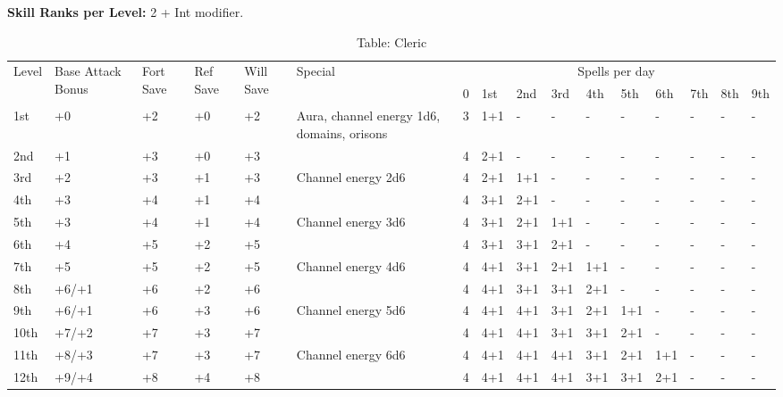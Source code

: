 \textbf{Skill Ranks per Level: }2 + Int modifier.

\begin{table}[]
\caption{Table: Cleric}
\sffamily
\setlength{\tabcolsep}{1pt}
\begin{tabularx}{\linewidth}{lp{6em}p{2.5em}p{2.5em}p{2.5em}Xllllllllll}
\multirow{2}{*}{Level} & \multirow{2}{*}{\parbox{5em}{Base Attack Bonus}} & \multirow{2}{*}{\parbox{1.5em}{Fort Save}} & \multirow{2}{*}{\parbox{1.5em}{Ref Save}} & \multirow{2}{*}{\parbox{1.5em}{Will Save}} & Special                                                                                              & \multicolumn{10}{c}{Spells per day} \\
                       &                                    &                            &                           &                            &                                                                                                  &  0 & 1st & 2nd & 3rd & 4th & 5th & 6th & 7th & 8th & 9th \\
\hline
1st & +0 & +2 & +0 & +2 & Aura, channel energy 1d6, domains, orisons & 3 & 1+1 & - & - & - & - & - & - & - & -\\
2nd & +1 & +3 & +0 & +3 &  & 4 & 2+1 & - & - & - & - & - & - & - & -\\
3rd & +2 & +3 & +1 & +3 & Channel energy 2d6 & 4 & 2+1 & 1+1 & - & - & - & - & - & - & -\\
4th & +3 & +4 & +1 & +4 &  & 4 & 3+1 & 2+1 & - & - & - & - & - & - & -\\
5th & +3 & +4 & +1 & +4 & Channel energy 3d6 & 4 & 3+1 & 2+1 & 1+1 & - & - & - & - & - & -\\
6th & +4 & +5 & +2 & +5 &  & 4 & 3+1 & 3+1 & 2+1 & - & - & - & - & - & -\\
7th & +5 & +5 & +2 & +5 & Channel energy 4d6 & 4 & 4+1 & 3+1 & 2+1 & 1+1 & - & - & - & - & -\\
8th & +6/+1 & +6 & +2 & +6 &  & 4 & 4+1 & 3+1 & 3+1 & 2+1 & - & - & - & - & -\\
9th & +6/+1 & +6 & +3 & +6 & Channel energy 5d6 & 4 & 4+1 & 4+1 & 3+1 & 2+1 & 1+1 & - & - & - & -\\
10th & +7/+2 & +7 & +3 & +7 &  & 4 & 4+1 & 4+1 & 3+1 & 3+1 & 2+1 & - & - & - & -\\
11th & +8/+3 & +7 & +3 & +7 & Channel energy 6d6 & 4 & 4+1 & 4+1 & 4+1 & 3+1 & 2+1 & 1+1 & - & - & -\\
12th & +9/+4 & +8 & +4 & +8 &  & 4 & 4+1 & 4+1 & 4+1 & 3+1 & 3+1 & 2+1 & - & - & -\\

\end{tabularx}
\end{table}
